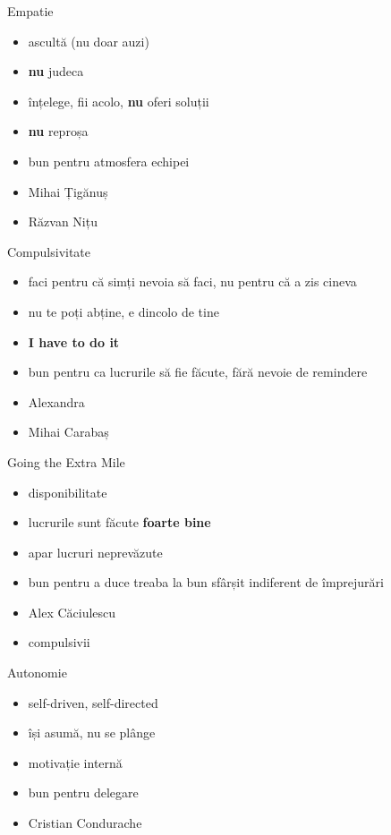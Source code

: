 \documentclass{beamer}
\begin{document}
\begin{frame}{Empatie}
  \begin{itemize}
    \pause \item ascultă (nu doar auzi)
    \pause \item \textbf{nu} judeca
    \pause \item înțelege, fii acolo, \textbf{nu} oferi soluții
    \pause \item \textbf{nu} reproșa
    \pause \item bun pentru atmosfera echipei
    \pause \item Mihai Țigănuș
    \pause \item Răzvan Nițu
  \end{itemize}
\end{frame}

\begin{frame}{Compulsivitate}
  \begin{itemize}
    \pause \item faci pentru că simți nevoia să faci, nu pentru că a zis cineva
    \pause \item nu te poți abține, e dincolo de tine
    \pause \item \textbf{I have to do it}
    \pause \item bun pentru ca lucrurile să fie făcute, fără nevoie de remindere
    \pause \item Alexandra
    \pause \item Mihai Carabaș
  \end{itemize}
\end{frame}

\begin{frame}{Going the Extra Mile}
  \begin{itemize}
    \pause \item disponibilitate
    \pause \item lucrurile sunt făcute \textbf{foarte bine}
    \pause \item apar lucruri neprevăzute
    \pause \item bun pentru a duce treaba la bun sfârșit indiferent de împrejurări
    \pause \item Alex Căciulescu
    \pause \item compulsivii
  \end{itemize}
\end{frame}

\begin{frame}{Autonomie}
  \begin{itemize}
    \pause \item self-driven, self-directed
    \pause \item își asumă, nu se plânge
    \pause \item motivație internă
    \pause \item bun pentru delegare
    \pause \item Cristian Condurache
  \end{itemize}
\end{frame}
\end{document}
